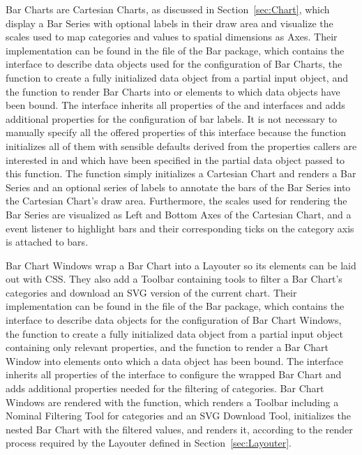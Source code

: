 Bar Charts are Cartesian Charts, as discussed in
Section~\ref{sec:Chart}, which display a Bar Series with optional
labels in their draw area and visualize the scales used to map
categories and values to spatial dimensions as Axes. Their
implementation can be found in the  file of the
Bar package, which contains the  interface to
describe data objects used for the configuration of Bar Charts, the
 function to create a fully initialized
 data object from a partial input object, and the
 function to render Bar Charts into
 or  elements to which  data
objects have been bound. The  interface inherits all
properties of the  and 
interfaces and adds additional properties for the configuration of bar
labels. It is not necessary to manually specify all the offered
properties of this interface because the  function
initializes all of them with sensible defaults derived from the
properties callers are interested in and which have been specified in
the partial data object passed to this function. The
 function simply initializes a Cartesian Chart
and renders a Bar Series and an optional series of labels to annotate
the bars of the Bar Series into the Cartesian Chart's draw area.
Furthermore, the scales used for rendering the Bar Series are
visualized as Left and Bottom Axes of the Cartesian Chart, and a
 event listener to highlight bars and their
corresponding ticks on the category axis is attached to bars.

Bar Chart Windows wrap a Bar Chart into a Layouter so its
elements can be laid out with CSS. They also add a Toolbar containing
tools to filter a Bar Chart's categories and download an SVG version
of the current chart. Their implementation can be found in the
 file of the Bar package, which
contains the  interface to describe data objects
for the configuration of Bar Chart Windows, the
 function to create a fully initialized
 data object from a partial input object
containing only relevant properties, and the
 function to render a Bar Chart Window into
 elements onto which a  data object
has been bound. The  interface inherits all
properties of the  interface to configure the wrapped
Bar Chart and adds additional properties needed for the filtering of
categories. Bar Chart Windows are rendered with the
 function, which renders a Toolbar
including a Nominal Filtering Tool for categories and an SVG Download
Tool, initializes the nested Bar Chart with the filtered values, and
renders it, according to the render process required by the
Layouter defined in Section~\ref{sec:Layouter}.


